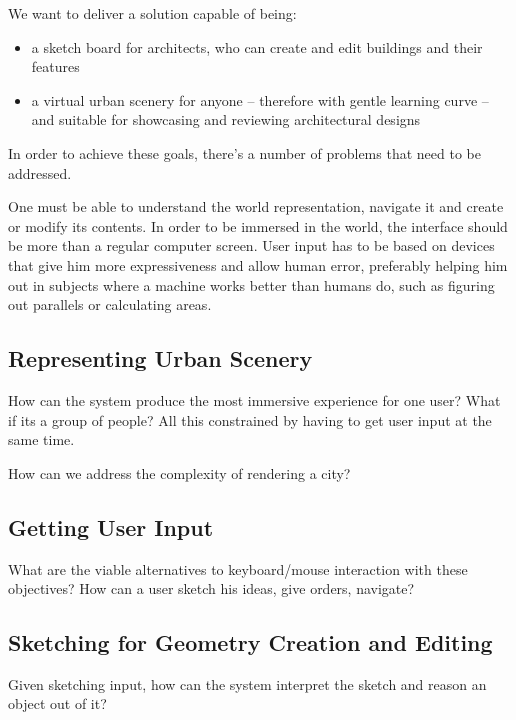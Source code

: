 
We want to deliver a solution capable of being:
\begin{itemize}
	\item a sketch board for architects, who can create and edit buildings and their features
	\item a virtual urban scenery for anyone -- therefore with gentle learning curve -- and suitable for showcasing and reviewing architectural designs
\end{itemize}
In order to achieve these goals, there's a number of problems that need to be addressed.

One must be able to understand the world representation, navigate it and create or modify its contents.
In order to be immersed in the world, the interface should be more than a regular computer screen.
User input has to be based on devices that give him more expressiveness and allow human error,
preferably helping him out in subjects where a machine works better than humans do, such as figuring
out parallels or calculating areas.


\subsection{Representing Urban Scenery}
How can the system produce the most immersive experience for one user?
What if its a group of people? All this constrained by having to get user input at the same time.

How can we address the complexity of rendering a city?


\subsection{Getting User Input}
What are the viable alternatives to keyboard/mouse interaction with these objectives?
How can a user sketch his ideas, give orders, navigate?


\subsection{Sketching for Geometry Creation and Editing}
Given sketching input, how can the system interpret the sketch and reason an object
out of it?
 

